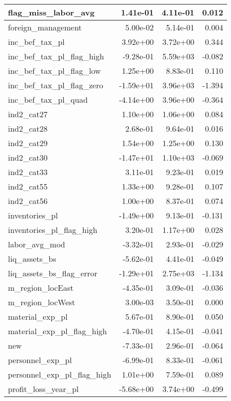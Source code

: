 \begin{table}
\begin{tabular}[t]{l|r|r|r}
\hline
flag\_miss\_labor\_avg & 1.41e-01 & 4.11e-01 & 0.012\\
\hline
foreign\_management & 5.00e-02 & 5.14e-01 & 0.004\\
\hline
inc\_bef\_tax\_pl & 3.92e+00 & 3.72e+00 & 0.344\\
\hline
inc\_bef\_tax\_pl\_flag\_high & -9.28e-01 & 5.59e+03 & -0.082\\
\hline
inc\_bef\_tax\_pl\_flag\_low & 1.25e+00 & 8.83e-01 & 0.110\\
\hline
inc\_bef\_tax\_pl\_flag\_zero & -1.59e+01 & 3.96e+03 & -1.394\\
\hline
inc\_bef\_tax\_pl\_quad & -4.14e+00 & 3.96e+00 & -0.364\\
\hline
ind2\_cat27 & 1.10e+00 & 1.06e+00 & 0.084\\
\hline
ind2\_cat28 & 2.68e-01 & 9.64e-01 & 0.016\\
\hline
ind2\_cat29 & 1.54e+00 & 1.25e+00 & 0.130\\
\hline
ind2\_cat30 & -1.47e+01 & 1.10e+03 & -0.069\\
\hline
ind2\_cat33 & 3.11e-01 & 9.23e-01 & 0.019\\
\hline
ind2\_cat55 & 1.33e+00 & 9.28e-01 & 0.107\\
\hline
ind2\_cat56 & 1.00e+00 & 8.37e-01 & 0.074\\
\hline
inventories\_pl & -1.49e+00 & 9.13e-01 & -0.131\\
\hline
inventories\_pl\_flag\_high & 3.20e-01 & 1.17e+00 & 0.028\\
\hline
labor\_avg\_mod & -3.32e-01 & 2.93e-01 & -0.029\\
\hline
liq\_assets\_bs & -5.62e-01 & 4.41e-01 & -0.049\\
\hline
liq\_assets\_bs\_flag\_error & -1.29e+01 & 2.75e+03 & -1.134\\
\hline
m\_region\_locEast & -4.35e-01 & 3.09e-01 & -0.036\\
\hline
m\_region\_locWest & 3.00e-03 & 3.50e-01 & 0.000\\
\hline
material\_exp\_pl & 5.67e-01 & 8.90e-01 & 0.050\\
\hline
material\_exp\_pl\_flag\_high & -4.70e-01 & 4.15e-01 & -0.041\\
\hline
new & -7.33e-01 & 2.96e-01 & -0.064\\
\hline
personnel\_exp\_pl & -6.99e-01 & 8.33e-01 & -0.061\\
\hline
personnel\_exp\_pl\_flag\_high & 1.01e+00 & 7.59e-01 & 0.089\\
\hline
profit\_loss\_year\_pl & -5.68e+00 & 3.74e+00 & -0.499\\

\end{tabular}
\end{table}
